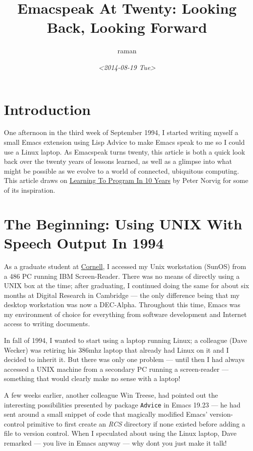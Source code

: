 \documentclass[11pt]{article}
\author{raman}
\date{\textit{<2014-08-19 Tue>}}
\title{Emacspeak At Twenty: Looking Back, Looking Forward}
\begin{document}
\maketitle
\tableofcontents

\section{Introduction}
\label{sec-1}

One afternoon in the third week of September 1994, I started
writing myself a small Emacs extension using Lisp Advice to make
Emacs speak to me so I could use a Linux laptop. As Emacspeak
turns twenty, this article is both a quick look back over the
twenty years of lessons learned, as well as a glimpse into what
might be possible as we evolve to a world of connected,
ubiquitous computing. This article draws on \href{http://norvig.com/21-days.html}{Learning To Program
In 10 Years} by Peter Norvig for some of its inspiration.

\section{The Beginning: Using UNIX With Speech Output In 1994}
\label{sec-2}

As a graduate student at \href{http://www.cs.cornell.edu/info/people/raman/raman.html}{Cornell},  I accessed my Unix workstation
(SunOS) from a 486 PC running IBM Screen-Reader.  There was no
means of directly using a UNIX box at the time; after graduating,
I continued doing the same for about six months at Digital
Research in Cambridge   —   the only difference being that my
desktop workstation was now a DEC-Alpha. Throughout this time,
Emacs was my environment of choice for everything from software
development and Internet access to writing documents.


In fall of 1994, I wanted to start using a laptop running Linux;
a colleague (Dave Wecker) was retiring his 386mhz laptop that
already had Linux on it and I decided to inherit it. But there
was only one problem   —   until then I had always accessed a UNIX
machine from a secondary PC running a screen-reader   —   something
that would clearly make no sense with a laptop!

A few weeks earlier, another colleague Win Treese, had pointed
out the interesting possibilities presented by package \texttt{Advice}
 in Emacs 19.23   —   he had sent around a
small snippet of code that magically modified Emacs'
version-control primitive to first create an \emph{RCS} directory if
none existed before adding a file to version control. When I
speculated about using the Linux laptop, Dave remarked   —   you
live in Emacs anyway   —   why dont you just make it talk!
\end{document}
